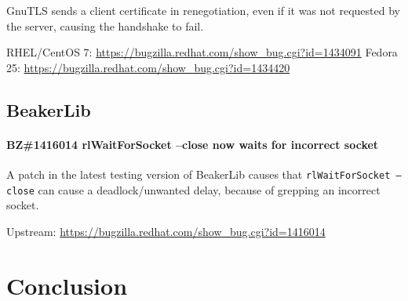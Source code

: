     GnuTLS sends a client certificate in renegotiation, even if it was not
    requested by the server, causing the handshake to fail.

    \medskip\noindent RHEL/CentOS 7: \url{https://bugzilla.redhat.com/show_bug.cgi?id=1434091}
    \newline\noindent Fedora 25: \url{https://bugzilla.redhat.com/show_bug.cgi?id=1434420}

\section{BeakerLib}
\subsubsection*{BZ\#1416014  \newline
    rlWaitForSocket --close now waits for incorrect socket}

    A patch in the latest testing version of BeakerLib causes that
    \texttt{rlWaitForSocket --close} can cause a deadlock/unwanted delay,
    because of grepping an incorrect socket.

    \medskip\noindent Upstream: \url{https://bugzilla.redhat.com/show_bug.cgi?id=1416014}

\chapter {Conclusion} \label{chap:conclusion}

